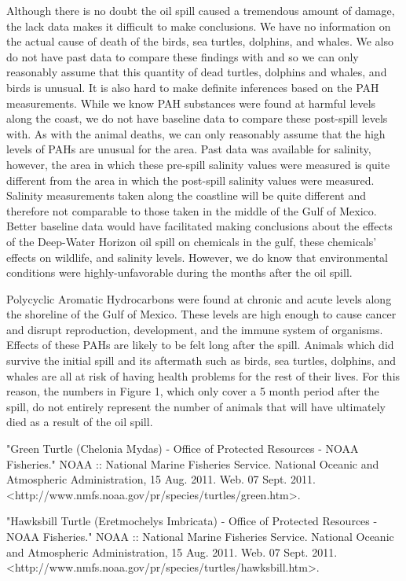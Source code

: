 \documentclass[11pt]{article}
\begin{document}
Although there is no doubt the oil spill caused a tremendous amount of damage, the lack data makes it difficult to make conclusions. We have no information on the actual cause of death of the birds, sea turtles, dolphins, and whales.  We also do not have past data to compare these findings with and so we can only reasonably assume that this quantity of dead turtles, dolphins and whales, and birds is unusual. It is also hard to make definite inferences based on the PAH measurements.  While we know PAH substances were found at harmful levels along the coast, we do not have baseline data to compare these post-spill levels with. As with the animal deaths, we can only reasonably assume that the high levels of PAHs are unusual for the area. Past data was available for salinity, however, the area in which these pre-spill salinity values were measured is quite different from the area in which the post-spill salinity values were measured.  Salinity measurements taken along the coastline will be quite different and therefore not comparable to those taken in the middle of the Gulf of Mexico. Better baseline data would have facilitated making conclusions about the effects of the Deep-Water Horizon oil spill on chemicals in the gulf, these chemicals' effects on wildlife, and salinity levels. However, we do know that environmental conditions were highly-unfavorable during the months after the oil spill.

Polycyclic Aromatic Hydrocarbons were found at chronic and acute levels along the shoreline of the Gulf of Mexico. These levels are high enough to cause cancer and disrupt reproduction, development, and the immune system of organisms. Effects of these PAHs are likely to be felt long after the spill. Animals which did survive the initial spill and its aftermath such as birds, sea turtles, dolphins, and whales are all at risk of having health problems for the rest of their lives. For this reason, the numbers in Figure 1, which only cover a 5 month period after the spill, do not entirely represent the number of animals that will have ultimately died as a result of the oil spill. 



"Green Turtle (Chelonia Mydas) - Office of Protected Resources - NOAA Fisheries." NOAA :: National Marine Fisheries Service. National Oceanic and Atmospheric Administration, 15 Aug. 2011. Web. 07 Sept. 2011. <http://www.nmfs.noaa.gov/pr/species/turtles/green.htm>.

"Hawksbill Turtle (Eretmochelys Imbricata) - Office of Protected Resources - NOAA Fisheries." NOAA :: National Marine Fisheries Service. National Oceanic and Atmospheric Administration, 15 Aug. 2011. Web. 07 Sept. 2011. <http://www.nmfs.noaa.gov/pr/species/turtles/hawksbill.htm>.
\end{document}
